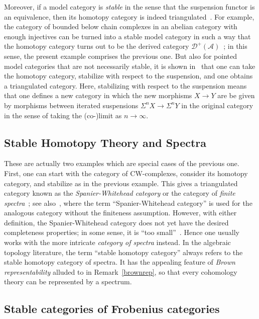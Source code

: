\documentclass{amsproc}
\theoremstyle{definition}
\begin{document}
Moreover, if a model category is \emph{stable} in the sense that the suspension functor is an equivalence, then its homotopy category is indeed triangulated~\cite[Ch.~7]{Hov}. For example, the category of bounded below chain complexes in an abelian category with enough injectives can be turned into a stable model category in such a way that the homotopy category turns out to be the derived category ${\mathcal{D}}^+({\mathcal{A}})$~\cite[p.~1.16]{Quillen}; in this sense, the present example comprises the previous one. But also for pointed model categories that are not necessarily stable, it is shown in~\cite{Del} that one can take the homotopy category, stabilize with respect to the suspension, and one obtains a triangulated category. Here, stabilizing with respect to the suspension means that one defines a new category in which the new morphisms $X{\longrightarrow} Y$ are be given by morphisms between iterated suspensions $\Sigma^n X{\longrightarrow} \Sigma^n Y$ in the original category in the sense of taking the (co-)limit as $n\to\infty$.

\subsection{Stable Homotopy Theory and Spectra}
\label{spectra}

These are actually two examples which are special cases of the previous one. First, one can start with the category of CW-complexes, consider its homotopy category, and stabilize as in the previous example. This gives a triangulated category known as the \emph{Spanier-Whitehead category} or the category of \emph{finite spectra}~\cite{Strickland}; see also~\cite{Margolis}, where the term ``Spanier-Whitehead category'' is used for the analogous category without the finiteness assumption. However, with either definition, the Spanier-Whitehead category does not yet have the desired completeness properties; in some sense, it is ``too small''~\cite[p.~vii]{Margolis}. Hence one usually works with the more intricate \emph{category of spectra} instead. In the algebraic topology literature, the term ``stable homotopy category'' always refers to the stable homotopy category of spectra. It has the appealing feature of \emph{Brown representability} alluded to in Remark~\ref{brownrep}, so that every cohomology theory can be represented by a spectrum.

\subsection{Stable categories of Frobenius categories}
\label{frob}
\end{document}
